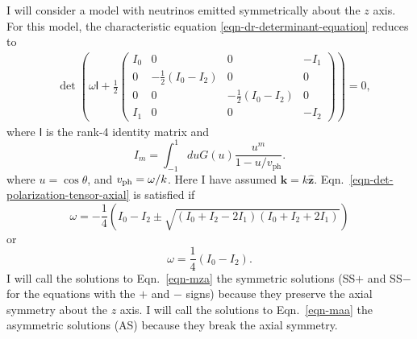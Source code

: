 I will consider a model with neutrinos emitted symmetrically about the $z$ axis. For this model, the characteristic equation \eqref{eqn-dr-determinant-equation} reduces to
\begin{align}
&\det \left( \omega \mathsf{I} + \frac{1}{2}
\begin{pmatrix}
   I_0 & 0 & 0 & -I_1 \\
   0 & -\frac{1}{2} (I_0 - I_2) & 0 & 0 \\
   0 & 0 & -\frac{1}{2} (I_0 - I_2) & 0 \\
   I_1 & 0 & 0 & -I_2
\end{pmatrix}\right) =0,
\label{eqn-det-polarization-tensor-axial}
\end{align}
where $\mathsf I$ is the rank-4 identity matrix and
\begin{equation}
   I_m =\int_{-1}^{1} d u G(u) \frac{u^m}{1 -  u/v_{\mathrm{ph}} }.
\end{equation}
where $u=\cos\theta$, and $v_{\mathrm{ph}}=\omega/k$. Here I have assumed $\mathbf k = k \hat{\mathbf z}$. %
Eqn.~\eqref{eqn-det-polarization-tensor-axial} is satisfied if
\begin{equation}
    \omega  = - \frac{1}{4} \left( I_0 - I_2 \pm \sqrt{ (I_0 + I_2 - 2 I_1) (I_0 + I_2 + 2 I_1) } \right)
    \label{eqn-mza}
\end{equation}
or
\begin{equation}
   \omega = \frac{1}{4}(I_0 - I_2).
   \label{eqn-maa}
\end{equation}
I will call the solutions to Eqn.~\eqref{eqn-mza} the symmetric solutions (SS$+$ and SS$-$ for the equations with the $+$ and $-$ signs) because they preserve the axial symmetry about the $z$ axis. I will call the solutions to Eqn.~\eqref{eqn-maa} the asymmetric solutions (AS) because they break the axial symmetry.




